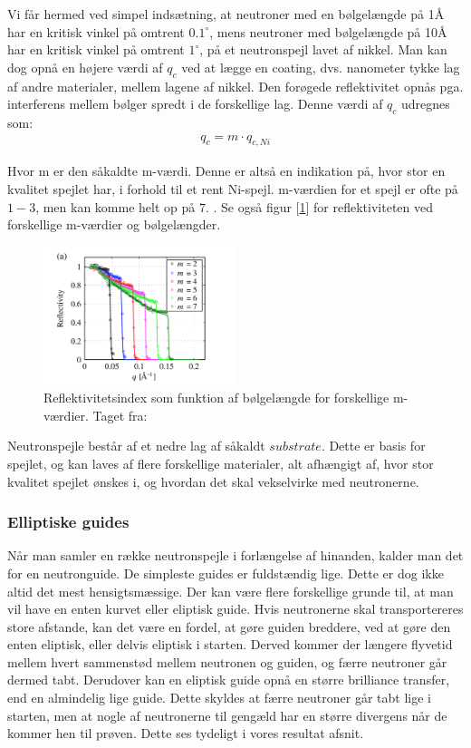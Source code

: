 \documentclass[12pt,oneside,a4paper]{article}
\begin{document}
{{{{{Vi får hermed ved simpel indsætning, at neutroner med en bølgelængde på 1Å har en kritisk vinkel på omtrent $0.1^∘$, mens neutroner med bølgelængde på 10Å har en kritisk vinkel på omtrent $1^∘$, på et neutronspejl lavet af nikkel.
Man kan dog opnå en højere værdi af $q_c$ ved at lægge en coating, dvs. nanometer tykke lag af andre materialer, mellem lagene af nikkel. Den forøgede reflektivitet opnås pga. interferens mellem bølger spredt i de forskellige lag. Denne værdi af $q_c$ udregnes som:
\begin{align}
q_c=m \cdot q_{c,Ni}
\end{align}

Hvor m er den såkaldte m-værdi. Denne er altså en indikation på, hvor stor en kvalitet spejlet har, i forhold til et rent Ni-spejl. m-værdien for et spejl er ofte på $1-3$, men kan komme helt op på $7$. \cite{lefmann_arleth_kirkensgaard_lebech_thomsen}. Se også figur [\ref{fig:m_values_lambda}] for reflektiviteten ved forskellige m-værdier og bølgelængder.

\begin{figure}[H]
    \centering
    \includegraphics[width=0.5\textwidth]{m-values-lambda.png}
    \caption{Reflektivitetsindex som funktion af bølgelængde for forskellige m-værdier. Taget fra: \cite{Jacobsen201369}} \label{fig:m_values_lambda}
\end{figure}

Neutronspejle består af et nedre lag af såkaldt $substrate$. Dette er basis for spejlet, og kan laves af flere forskellige materialer, alt afhængigt af, hvor stor kvalitet spejlet ønskes i, og hvordan det skal vekselvirke med neutronerne.

\subsubsection{Elliptiske guides}
Når man samler en række neutronspejle i forlængelse af hinanden, kalder man det for en neutronguide. De simpleste guides er fuldstændig lige. Dette er dog ikke altid det mest hensigtsmæssige. Der kan være flere forskellige grunde til, at man vil have en enten kurvet eller eliptisk guide. 
Hvis neutronerne skal transportereres store afstande, kan det være en fordel, at gøre guiden breddere, ved at gøre den enten eliptisk, eller delvis eliptisk i starten. Derved kommer der længere flyvetid mellem hvert sammenstød mellem neutronen og guiden, og færre neutroner går dermed tabt. 
Derudover kan en eliptisk guide opnå en større brilliance transfer, end en almindelig lige guide. Dette skyldes at færre neutroner går tabt lige  i starten, men at nogle af neutronerne til gengæld har en større divergens når de kommer hen til prøven. Dette ses tydeligt i vores resultat afsnit.

}}}}}
\end{document}
